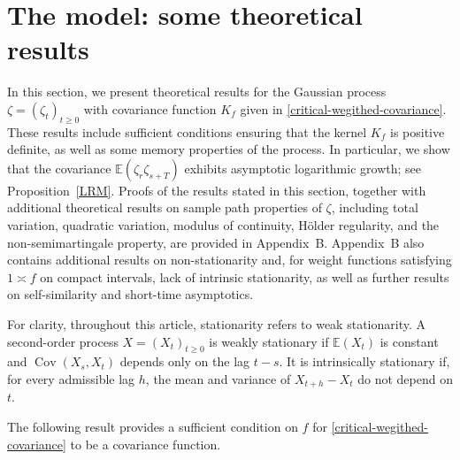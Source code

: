\documentclass[preprint,12pt,authoryear]{elsarticle}
\begin{document}

\section{The model: some theoretical results}\label{theory}


In this section, we present theoretical results for the Gaussian process $\zeta=(\zeta_t)_{t\geq 0}$ with covariance function $K_f$ given in \eqref{critical-wegithed-covariance}. These results include sufficient conditions ensuring that the kernel $K_f$ is positive definite, as well as some memory properties of the process. In particular, we show that the covariance $\mathbb{E}(\zeta_r\zeta_{s+T})$ exhibits asymptotic logarithmic growth; see Proposition~\ref{LRM}. Proofs of the results stated in this section, together with additional theoretical results on sample path properties of $\zeta$, including total variation, quadratic variation, modulus of continuity, Hölder regularity, and the non-semimartingale property, are provided in Appendix~B. Appendix~B also contains additional results on non-stationarity and, for weight functions satisfying \(1\asymp f\) on compact intervals, lack of intrinsic stationarity, as well as further results on self-similarity and short-time asymptotics.


For clarity, throughout this article, stationarity refers to weak
stationarity. A second-order process \(X=(X_t)_{t\geq0}\) is weakly
stationary if \(\mathbb{E}(X_t)\) is constant and
\(\operatorname{Cov}(X_s,X_t)\) depends only on the lag \(t-s\).
It is intrinsically stationary if, for every admissible lag \(h\),
the mean and variance of \(X_{t+h}-X_t\) do not depend on \(t\).


The following result provides a sufficient condition on $f$ for \eqref{critical-wegithed-covariance} to be a covariance function.
\end{document}
